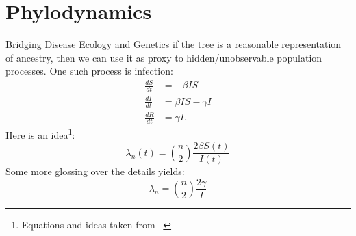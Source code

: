 \section*{Phylodynamics}
\begin{frame}{Bridging Disease Ecology and Genetics}
if the tree is a reasonable representation of ancestry, then we can use it as proxy to hidden/unobservable population processes.
One such process is infection:
\begin{align*}
 \frac{dS}{dt} &= -\beta I S \\
 \frac{dI}{dt} &=  \beta I S - \gamma I\\
 \frac{dR}{dt} &=  \gamma I.
\end{align*}
Here is an idea\footnote{\tiny Equations and ideas taken from~ \cite{volz2013}}:
\begin{equation*}
 \lambda_n(t) = \binom{n}{2}\frac{2\beta S(t)}{I(t)}
\end{equation*}
Some more glossing over the details yields:
\begin{equation*}
 \lambda_n = \binom{n}{2}\frac{2\gamma}{I}
\end{equation*}
\end{frame}
